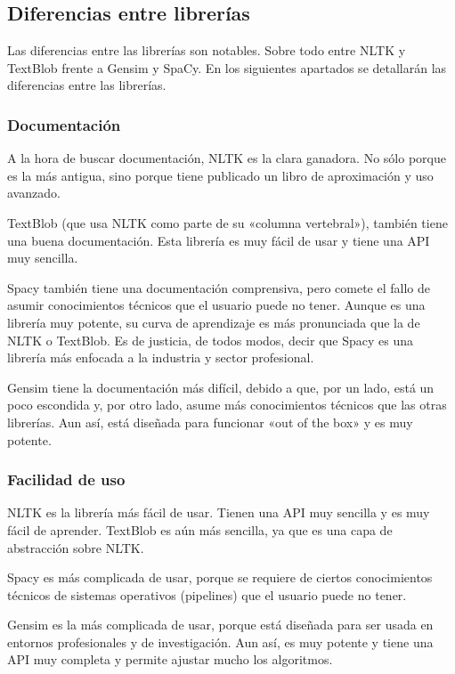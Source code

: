 \documentclass[a4paper,twocolumn]{article}
\begin{document}
    \subsection {Diferencias entre librerías}\label{subsec:diflibs}
    Las diferencias entre las librerías son notables.
    Sobre todo entre NLTK y TextBlob frente a Gensim y SpaCy.
    En los siguientes apartados se detallarán las diferencias entre las librerías.

    \subsubsection{Documentación}\label{subsubsec:doc}
    A la hora de buscar documentación, NLTK es la clara ganadora.
    No sólo porque es la más antigua, sino porque tiene publicado un libro de aproximación y uso avanzado\cite{bird2009natural}.

    TextBlob (que usa NLTK como parte de su «columna vertebral»), también tiene una buena documentación\cite{textblobdocs}.
    Esta librería es muy fácil de usar y tiene una API muy sencilla.

    Spacy \cite{spacydocs} también tiene una documentación comprensiva, pero comete el fallo de asumir conocimientos técnicos que el usuario puede no tener.
    Aunque es una librería muy potente, su curva de aprendizaje es más pronunciada que la de NLTK o TextBlob.
    Es de justicia, de todos modos, decir que Spacy es una librería más enfocada a la industria y sector profesional.

    Gensim \cite{gensimdocs} tiene la documentación más difícil, debido a que, por un lado, está un poco escondida y, por otro lado, asume más conocimientos técnicos que las otras librerías.
    Aun así, está diseñada para funcionar «out of the box» y es muy potente.

    \subsubsection{Facilidad de uso}\label{subsubsec:facilidad}

    NLTK es la librería más fácil de usar.
    Tienen una API muy sencilla y es muy fácil de aprender.
    TextBlob es aún más sencilla, ya que es una capa de abstracción sobre NLTK.

    Spacy es más complicada de usar, porque se requiere de ciertos conocimientos técnicos de sistemas operativos (pipelines) que el usuario puede no tener.

    Gensim es la más complicada de usar, porque está diseñada para ser usada en entornos profesionales y de investigación.
    Aun así, es muy potente y tiene una API muy completa y permite ajustar mucho los algoritmos.
\end{document}
